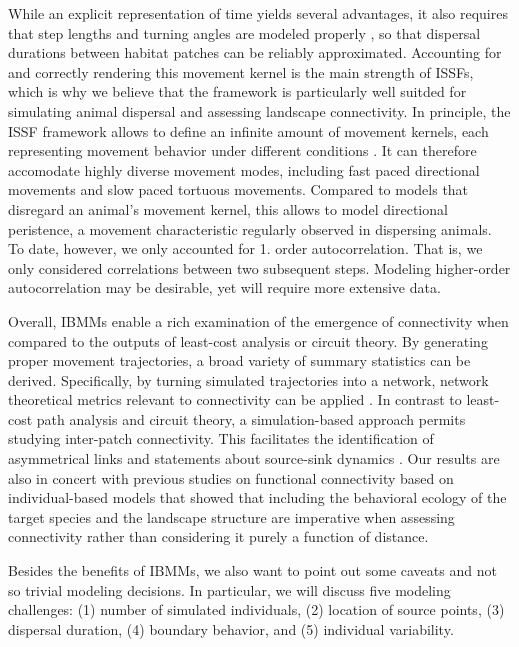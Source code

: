 \documentclass[abstract=on,10pt,a4paper,bibliography=totocnumbered]{article}
\begin{document}
While an explicit representation of time yields several advantages, it also
requires that step lengths and turning angles are modeled properly
\citep{Kanagaraj.2013}, so that dispersal durations between habitat patches can
be reliably approximated. Accounting for and correctly rendering this movement
kernel is the main strength of ISSFs, which is why we believe that the framework
is particularly well suitded for simulating animal dispersal and assessing
landscape connectivity. In principle, the ISSF framework allows to define an
infinite amount of movement kernels, each representing movement behavior under
different conditions \citep{Fieberg.2020}. It can therefore accomodate highly
diverse movement modes, including fast paced directional movements and slow
paced tortuous movements. Compared to models that disregard an animal's movement
kernel, this allows to model directional peristence, a movement characteristic
regularly observed in dispersing animals. To date, however, we only accounted
for 1. order autocorrelation. That is, we only considered correlations between
two subsequent steps. Modeling higher-order autocorrelation may be desirable,
yet will require more extensive data.

Overall, IBMMs enable a rich examination of the emergence of connectivity when
compared to the outputs of least-cost analysis or circuit theory. By generating
proper movement trajectories, a broad variety of summary statistics can be
derived. Specifically, by turning simulated trajectories into a network, network
theoretical metrics relevant to connectivity can be applied
\citep{BastilleRousseau.2018}. In contrast to least-cost path analysis and
circuit theory, a simulation-based approach permits studying inter-patch
connectivity. This facilitates the identification of asymmetrical links and
statements about source-sink dynamics \citep{Ferreras.2001, Revilla.2004,
Kanagaraj.2013}. Our results are also in concert with previous studies on
functional connectivity based on individual-based models that showed that
including the behavioral ecology of the target species and the landscape
structure are imperative when assessing connectivity \citep{Gustafson.1996,
Gardner.2004, Graf.2007, KramerSchadt.2004, Revilla.2004, Revilla.2008,
Kanagaraj.2013} rather than considering it purely a function of distance.

Besides the benefits of IBMMs, we also want to point out some caveats and not so
trivial modeling decisions. In particular, we will discuss five modeling
challenges: (1) number of simulated individuals, (2) location of source points,
(3) dispersal duration, (4) boundary behavior, and (5) individual variability.
\end{document}
